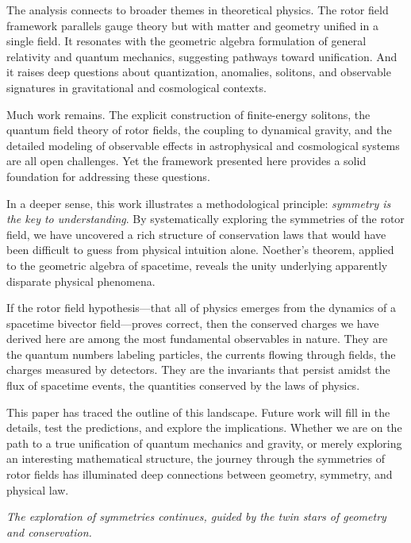 \documentclass[11pt,a4paper]{article}
\numberwithin{equation}{section}
\theoremstyle{plain}
\theoremstyle{definition}
\theoremstyle{remark}
\newif\ifack
\begin{document}
The analysis connects to broader themes in theoretical physics. The rotor field framework parallels gauge theory but with matter and geometry unified in a single field. It resonates with the geometric algebra formulation of general relativity and quantum mechanics, suggesting pathways toward unification. And it raises deep questions about quantization, anomalies, solitons, and observable signatures in gravitational and cosmological contexts.

Much work remains. The explicit construction of finite-energy solitons, the quantum field theory of rotor fields, the coupling to dynamical gravity, and the detailed modeling of observable effects in astrophysical and cosmological systems are all open challenges. Yet the framework presented here provides a solid foundation for addressing these questions.

In a deeper sense, this work illustrates a methodological principle: \emph{symmetry is the key to understanding}. By systematically exploring the symmetries of the rotor field, we have uncovered a rich structure of conservation laws that would have been difficult to guess from physical intuition alone. Noether's theorem, applied to the geometric algebra of spacetime, reveals the unity underlying apparently disparate physical phenomena.

If the rotor field hypothesis---that all of physics emerges from the dynamics of a spacetime bivector field---proves correct, then the conserved charges we have derived here are among the most fundamental observables in nature. They are the quantum numbers labeling particles, the currents flowing through fields, the charges measured by detectors. They are the invariants that persist amidst the flux of spacetime events, the quantities conserved by the laws of physics.

This paper has traced the outline of this landscape. Future work will fill in the details, test the predictions, and explore the implications. Whether we are on the path to a true unification of quantum mechanics and gravity, or merely exploring an interesting mathematical structure, the journey through the symmetries of rotor fields has illuminated deep connections between geometry, symmetry, and physical law.

\medskip
\noindent\textit{The exploration of symmetries continues, guided by the twin stars of geometry and conservation.}

\ifack
\section*{Acknowledgements}
The author is indebted to the pioneering work of Emmy Noether, whose theorem has guided generations of physicists. The development of geometric algebra by David Hestenes, and its application to gravity by Anthony Lasenby, Chris Doran, and Stephen Gull, provided essential conceptual foundations. Conversations with colleagues on Noether currents, spin connections, and topological charges were invaluable. This work was conducted independently without external funding. Any errors or omissions are the author's alone.
\fi
\end{document}
